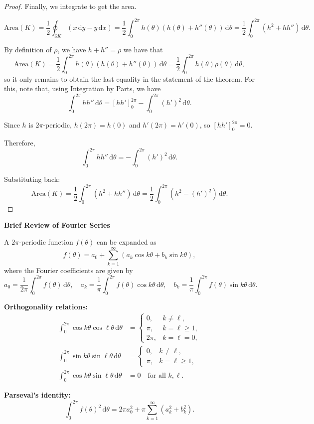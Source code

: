 \documentclass[11pt,letterpaper,reqno]{amsart}
\newcommand{\dd}{\,\mathrm{d}}
\begin{document}
\begin{explanation}
\begin{proof}
Finally, we integrate to get the area.

\[
\text{Area}(K)=\frac{1}{2}\oint_{\partial K}(x\dd y-y\dd x)=\frac{1}{2}\int_0^{2\pi}h(\theta)(h(\theta)+h''(\theta))\dd\theta=\frac{1}{2}\int_0^{2\pi}(h^2+hh'')\dd\theta.
\]

By definition of $\rho$, we have $h+h''=\rho$ we have that 
\[\text{Area}(K)=\frac{1}{2}\int_0^{2\pi}h(\theta)(h(\theta)+h''(\theta))\dd\theta=\frac{1}{2}\int_0^{2\pi}h(\theta)\rho(\theta)\dd\theta,\]
so it only remains to obtain the last equality in the statement of the theorem. For this, note that, using Integration by Parts, we have 
\[
\int_0^{2\pi}hh''\dd\theta=\left[hh'\right]_0^{2\pi}-\int_0^{2\pi}(h')^2\dd\theta.
\]

Since $h$ is $2\pi$-periodic, $h(2\pi)=h(0)$ and $h'(2\pi)=h'(0)$, so $[hh']_0^{2\pi}=0$.

Therefore,
\[
\int_0^{2\pi}hh''\dd\theta=-\int_0^{2\pi}(h')^2\dd\theta.
\]

Substituting back:
\[
\text{Area}(K)=\frac{1}{2}\int_0^{2\pi}(h^2+hh'')\dd\theta=\frac{1}{2}\int_0^{2\pi}(h^2-(h')^2)\dd\theta.
\]
\end{proof}
\end{explanation}

\begin{explanation}
    
\textbf{Brief Review of Fourier Series}

A $2\pi$-periodic function $f(\theta)$ can be expanded as
\[
f(\theta)=a_0+\sum_{k=1}^\infty(a_k\cos k\theta+b_k\sin k\theta),
\]
where the Fourier coefficients are given by
\[
a_0=\frac{1}{2\pi}\int_0^{2\pi}f(\theta)\dd\theta,\quad a_k=\frac{1}{\pi}\int_0^{2\pi}f(\theta)\cos k\theta\dd\theta,\quad b_k=\frac{1}{\pi}\int_0^{2\pi}f(\theta)\sin k\theta\dd\theta.
\]

\textbf{Orthogonality relations:}
\begin{align*}
\int_0^{2\pi}\cos k\theta\cos\ell\theta\dd\theta&=\begin{cases}0,&k\ne\ell,\\\pi,&k=\ell\ge 1,\\2\pi,&k=\ell=0,\end{cases}\\
\int_0^{2\pi}\sin k\theta\sin\ell\theta\dd\theta&=\begin{cases}0,&k\ne\ell,\\\pi,&k=\ell\ge 1,\end{cases}\\
\int_0^{2\pi}\cos k\theta\sin\ell\theta\dd\theta&=0\quad\text{for all }k,\ell.
\end{align*}

\textbf{Parseval's identity:}
\[
\int_0^{2\pi}f(\theta)^2\dd\theta=2\pi a_0^2+\pi\sum_{k=1}^\infty(a_k^2+b_k^2).
\]


\end{explanation}
\end{document}
